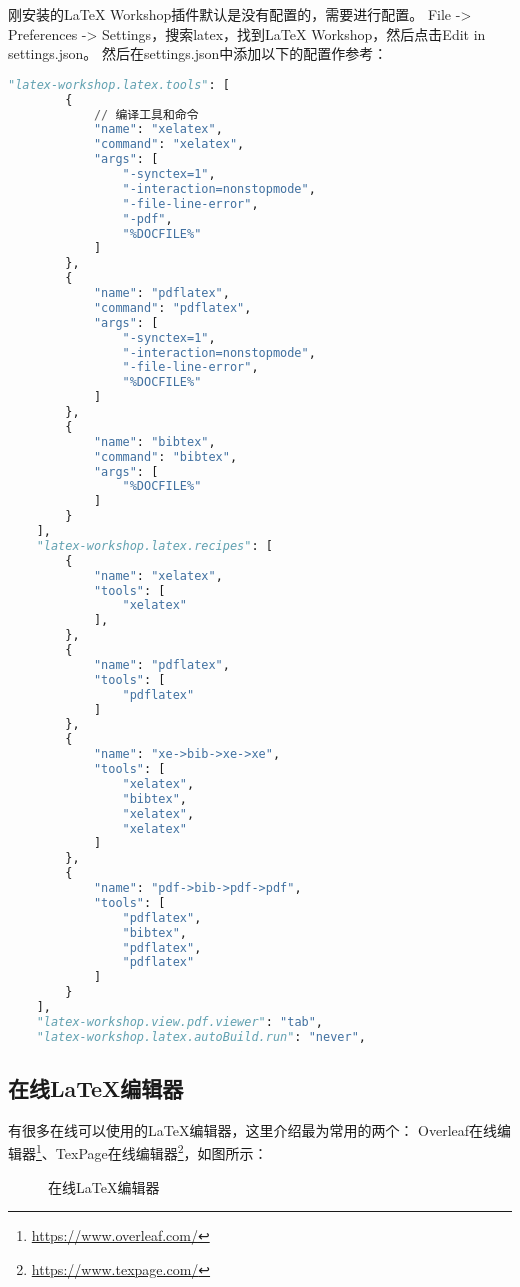 \documentclass[lang=cn,a4paper,newtx]{elegantpaper}
\begin{document}
刚安装的LaTeX Workshop插件默认是没有配置的，需要进行配置。
File -> Preferences -> Settings，搜索latex，找到LaTeX Workshop，然后点击Edit in settings.json。
然后在settings.json中添加以下的配置作参考：
\begin{lstlisting}[language=python]
  "latex-workshop.latex.tools": [
        {
            // 编译工具和命令
            "name": "xelatex",
            "command": "xelatex",
            "args": [
                "-synctex=1",
                "-interaction=nonstopmode",
                "-file-line-error",
                "-pdf",
                "%DOCFILE%"
            ]
        },
        {
            "name": "pdflatex",
            "command": "pdflatex",
            "args": [
                "-synctex=1",
                "-interaction=nonstopmode",
                "-file-line-error",
                "%DOCFILE%"
            ]
        },
        {
            "name": "bibtex",
            "command": "bibtex",
            "args": [
                "%DOCFILE%"
            ]
        }
    ],
    "latex-workshop.latex.recipes": [
        {
            "name": "xelatex",
            "tools": [
                "xelatex"
            ],
        },
        {
            "name": "pdflatex",
            "tools": [
                "pdflatex"
            ]
        },
        {
            "name": "xe->bib->xe->xe",
            "tools": [
                "xelatex",
                "bibtex",
                "xelatex",
                "xelatex"
            ]
        },
        {
            "name": "pdf->bib->pdf->pdf",
            "tools": [
                "pdflatex",
                "bibtex",
                "pdflatex",
                "pdflatex"
            ]
        }
    ],
    "latex-workshop.view.pdf.viewer": "tab",
    "latex-workshop.latex.autoBuild.run": "never",
\end{lstlisting}
\subsection{在线LaTeX编辑器}
有很多在线可以使用的LaTeX编辑器，这里介绍最为常用的两个：
Overleaf在线编辑器\footnote{\url{https://www.overleaf.com/}}、TexPage在线编辑器\footnote{\url{https://www.texpage.com/}}，如图所示：

\begin{figure}[hbpt]
  \caption{在线LaTeX编辑器}
  \label{fig:online-latex-editor}
\end{figure}
\end{document}
